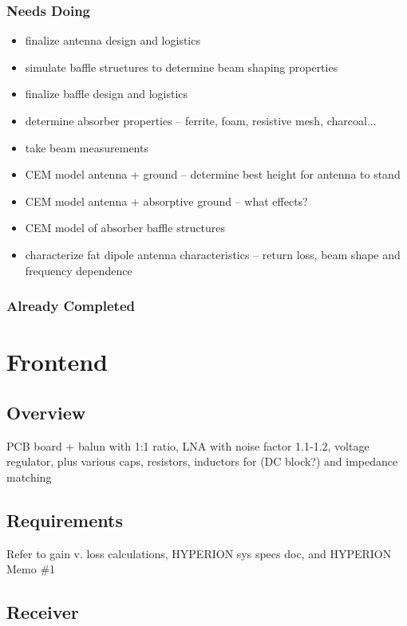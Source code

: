 \documentclass[11pt]{report}
\begin{document}
\subsubsection{Needs Doing}
\begin{itemize}
 \item finalize antenna design and logistics
 \item simulate baffle structures to determine beam shaping properties
 \item finalize baffle design and logistics
 \item determine absorber properties -- ferrite, foam, resistive mesh, 
  charcoal...
 \item take beam measurements
 \item CEM model antenna + ground -- determine best height for antenna to stand
 \item CEM model antenna + absorptive ground -- what effects?
 \item CEM model of absorber baffle structures
 \item characterize fat dipole antenna characteristics -- return loss, beam 
  shape and frequency dependence
\end{itemize}

\subsubsection{Already Completed}

\section{Frontend}

\subsection{Overview}

PCB board + balun with 1:1 ratio, LNA with noise factor 1.1-1.2, voltage 
regulator, plus various caps, resistors, inductors for (DC block?) and 
impedance matching

\subsection{Requirements}

Refer to gain v. loss calculations, HYPERION sys specs doc, and HYPERION Memo 
\#1

\subsection{Receiver}
\end{document}

